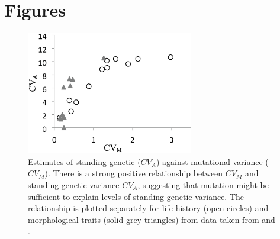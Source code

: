 \setcounter{figure}{0}
\newpage
\FloatBarrier
\section*{Figures}
\bigskip
\begin{figure}[htp]
\centering
\includegraphics[width=0.65\textwidth]{Chp1_Intro/IntroFig}
\vspace{-1cm}
\caption[Estimates of standing genetic ($CV_A$) against mutational variance ($CV_M$).]{Estimates of standing genetic ($CV_A$) against mutational variance ($CV_M$). There is a strong positive relationship between $CV_M$ and standing genetic variance $CV_A$, suggesting that mutation might be sufficient to explain levels of standing genetic variance. The relationship is plotted separately for life history (open circles) and morphological traits (solid grey triangles) from data taken from \citet{Houl96} and \citet{Houl98}.}
\label{fig:CvaCvm}
\end{figure}
